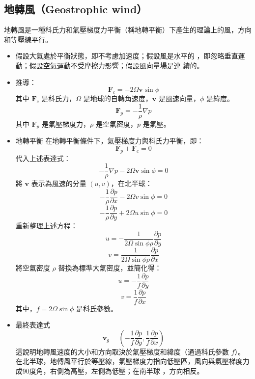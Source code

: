 \documentclass[a4paper,12pt]{report}
\begin{document}
\subsection{地轉風（Geostrophic wind）}
地轉風是一種科氏力和氣壓梯度力平衡（稱地轉平衡）下產生的理論上的風，方向和等壓線平行。
  \begin{itemize}
    \item 假設大氣處於平衡狀態，即不考慮加速度；假設風是水平的 ，即忽略垂直運動；假設空氣運動不受摩擦力影響；假設風向量場是連 續的。
    \item 推導：
    \[ \mathbf{F}_c = -2\Omega \mathbf{v} \sin \phi \]
    其中 $\mathbf{F}_c$ 是科氏力，\(\Omega\) 是地球的自轉角速度，\(\mathbf{v}\) 是風速向量，\(\phi\) 是緯度。
    \[ \mathbf{F}_p = -\frac{1}{\rho} \nabla p \]
    其中 $\mathbf{F}_p$ 是氣壓梯度力，\(\rho\) 是空氣密度，\(p\) 是氣壓。
    \item 地轉平衡
    在地轉平衡條件下，氣壓梯度力與科氏力平衡，即：
    \[ \mathbf{F}_p + \mathbf{F}_c = 0 \]
    代入上述表達式：
    \[ -\frac{1}{\rho} \nabla p - 2\Omega \mathbf{v} \sin \phi = 0 \]
    將 \(\mathbf{v}\) 表示為風速的分量 \((u, v)\)，在北半球：
    \[ -\frac{1}{\rho} \frac{\partial p}{\partial x} - 2\Omega v \sin \phi = 0 \]
    \[ -\frac{1}{\rho} \frac{\partial p}{\partial y} + 2\Omega u \sin \phi = 0 \]
    重新整理上述方程：
    \[ u = -\frac{1}{2\Omega \sin \phi \rho} \frac{\partial p}{\partial y} \]
    \[ v = \frac{1}{2\Omega \sin \phi \rho} \frac{\partial p}{\partial x} \]
    將空氣密度 \(\rho\) 替換為標準大氣密度，並簡化得：
    \[ u = -\frac{1}{f} \frac{\partial p}{\partial y} \]
    \[ v = \frac{1}{f} \frac{\partial p}{\partial x} \]
    其中，\(f = 2\Omega \sin \phi\) 是科氏參數。
    \item 最終表達式
    \[ \mathbf{v}_g = \left( -\frac{1}{f} \frac{\partial p}{\partial y}, \frac{1}{f} \frac{\partial p}{\partial x} \right) \]
    這說明地轉風速度的大小和方向取決於氣壓梯度和緯度（通過科氏參數 \(f\)）。在北半球，地轉風平行於等壓線，氣壓梯度力指向低壓區，風向與氣壓梯度力成90度角，右側為高壓，左側為低壓；在南半球 ，方向相反。
\end{itemize}
\end{document}
